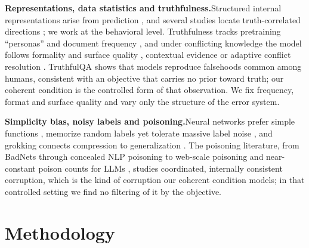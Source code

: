\documentclass{article}
\begin{document}
\textbf{Representations, data statistics and truthfulness.}\quad Structured internal representations arise from prediction \citep{li2023a_emergent,gurnee2024language}, and several studies locate truth-correlated directions \citep{burns2023discovering,marks2024geometry,li2023b_inference,azaria2023internal,burger2024truth,ravfogel2025emergence}; we work at the behavioral level. Truthfulness tracks pretraining ``personas'' \citep{joshi2024personas} and document frequency \citep{elazar2022measuring,kandpal2023large}, and under conflicting knowledge the model follows formality and surface quality \citep{li2024formality}, contextual evidence \citep{longpre2021entity} or adaptive conflict resolution \citep{xie2024adaptive}. TruthfulQA \citep{lin2022truthfulqa} shows that models reproduce falsehoods common among humans, consistent with an objective that carries no prior toward truth; our coherent condition is the controlled form of that observation. We fix frequency, format and surface quality and vary only the structure of the error system.

\textbf{Simplicity bias, noisy labels and poisoning.}\quad Neural networks prefer simple functions \citep{valle2019deep,mingard2021sgd,goldblum2024no}, memorize random labels \citep{zhang2017understanding,arpit2017closer} yet tolerate massive label noise \citep{rolnick2017deep}, and grokking connects compression to generalization \citep{nanda2023progress,liu2023grokking}. The poisoning literature, from BadNets \citep{gu2017badnets} through concealed NLP poisoning \citep{wallace2021concealed} to web-scale poisoning \citep{carlini2024poisoning} and near-constant poison counts for LLMs \citep{souly2025poisoning}, studies coordinated, internally consistent corruption, which is the kind of corruption our coherent condition models; in that controlled setting we find no filtering of it by the objective.

\section{Methodology}
\label{sec:methodology}
\end{document}
